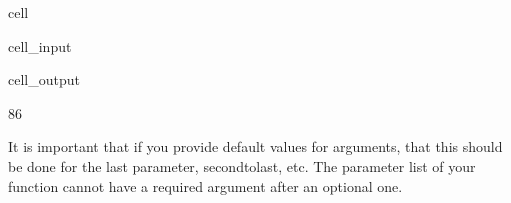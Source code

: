\documentclass[letterpaper,10pt,english]{jupyterBook}
\begin{document}
\begin{sphinxuseclass}{cell}\begin{sphinxVerbatimInput}

\begin{sphinxuseclass}{cell_input}
\begin{sphinxVerbatim}[commandchars=\\\{\}]
     
\end{sphinxVerbatim}

\end{sphinxuseclass}\end{sphinxVerbatimInput}
\begin{sphinxVerbatimOutput}

\begin{sphinxuseclass}{cell_output}
\begin{sphinxVerbatim}[commandchars=\\\{\}]
86
\end{sphinxVerbatim}

\end{sphinxuseclass}\end{sphinxVerbatimOutput}

\end{sphinxuseclass}
\sphinxAtStartPar
It is important that if you provide default values for arguments, that this should be done for the last parameter, second\sphinxhyphen{}to\sphinxhyphen{}last, etc. The parameter list of your function cannot have a required argument after an optional one.
\end{document}
